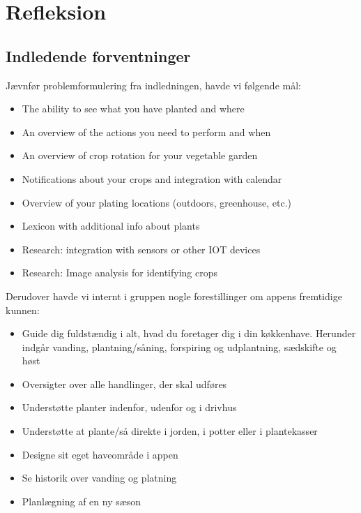 \section{Refleksion}

\subsection{Indledende forventninger}
Jævnfør problemformulering fra indledningen, havde vi følgende mål:

\begin{itemize}
        \item
    The ability to see what you have planted and where
        \item
    An overview of the actions you need to perform and when
        \item
    An overview of crop rotation for your vegetable garden
        \item
    Notifications about your crops and integration with calendar
        \item
    Overview of your plating locations (outdoors, greenhouse, etc.)
        \item
    Lexicon with additional info about plants 
        \item
    Research: integration with sensors or other IOT devices
        \item
    Research: Image analysis for identifying crops
\end{itemize}

Derudover havde vi internt i gruppen nogle forestillinger om appens fremtidige kunnen:

\begin{itemize}
    \item Guide dig fuldstændig i alt, hvad du foretager dig i din køkkenhave. Herunder indgår vanding, plantning/såning, forspiring og udplantning, sædskifte og høst
    \item Oversigter over alle handlinger, der skal udføres
    \item Understøtte planter indenfor, udenfor og i drivhus
    \item Understøtte at plante/så direkte i jorden, i potter eller i plantekasser
    \item Designe sit eget haveområde i appen
    \item Se historik over vanding og platning
    \item Planlægning af en ny sæson
\end{itemize}

